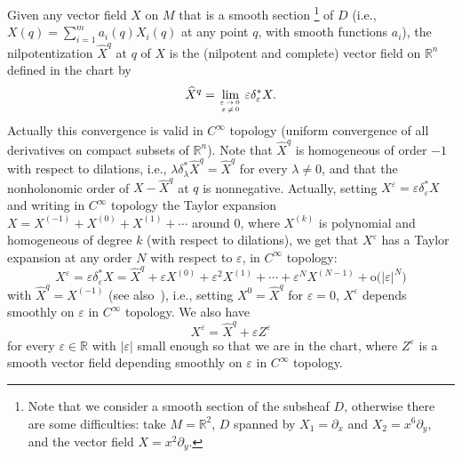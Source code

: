 \documentclass[AHL,Unicode,published]{cedram}
\newcommand*\R{\mathbb{R}}
\newcommand{\rmo}{\mathrm{o}}
\begin{document}
Given any vector field $X$ on $M$ that is a smooth section
\footnote{Note that we consider a smooth section of the subsheaf $D$, otherwise there are some difficulties: take $M=\R^2$, $D$ spanned by $X_1=\partial_x$ and $X_2=x^6\partial_y$, and the vector field $X=x^2\partial_y$.} of $D$ (i.e., $X(q) = \sum_{i=1}^m a_i(q) X_i(q)$ at any point $q$, with smooth functions $a_i$), the nilpotentization $\widehat{X}^{q}$ at $q$ of $X$ is the (nilpotent and complete) vector field on $\R^n$ defined in the chart by
\[
\widehat{X}^{q} = \lim_{\varepsilon\,\rightarrow\,0\,\atop \varepsilon\,\neq\,0}\varepsilon \delta_\varepsilon^* X.
\]
Actually this convergence is valid in $C^\infty$ topology (uniform convergence of all derivatives on compact subsets of $\R^n$). Note that $\widehat{X}^{q}$ is homogeneous of order $-1$ with respect to dilations, i.e., $\lambda\delta_\lambda^*\widehat{X}^{q}=\widehat{X}^{q}$ for every $\lambda\neq 0$, and that the nonholonomic order of $X-\widehat{X}^{q}$ at $q$ is nonnegative. Actually, setting $X^\varepsilon=\varepsilon\delta_\varepsilon^*X$ and writing in $C^\infty$ topology the Taylor expansion $X=X^{(-1)}+X^{(0)}+X^{(1)}+\cdots$ around $0$, where $X^{(k)}$ is polynomial and homogeneous of degree $k$ (with respect to dilations), we get that $X^\varepsilon$ has a Taylor expansion at any order $N$ with respect to $\varepsilon$, in $C^\infty$ topology:
\begin{equation}\label{expansion_Xeps}
X^\varepsilon = \varepsilon \delta_\varepsilon^* X = \widehat{X}^{q} + \varepsilon X^{(0)} + \varepsilon^2 X^{(1)} + \cdots + \varepsilon^N X^{(N-1)} + \rmo\big(\vert\varepsilon\vert^N\big)
\end{equation}
with $\widehat{X}^{q} = X^{(-1)}$ (see also~\cite[Lemma~1]{Ba-13}), i.e., setting $X^0=\widehat{X}^{q}$ for $\varepsilon=0$, $X^\varepsilon$ depends smoothly on $\varepsilon$ in $C^\infty$ topology. We also have
\begin{equation}\label{expansion_XZeps}
X^\varepsilon = \widehat{X}^{q} + \varepsilon Z^\varepsilon
\end{equation}
for every $\varepsilon\in\R$ with $\vert\varepsilon\vert$ small enough so that we are in the chart, where $Z^\varepsilon$ is a smooth vector field depending smoothly on $\varepsilon$ in $C^\infty$ topology.
\end{document}
